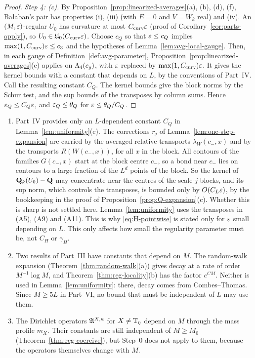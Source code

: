 \begin{proof}
\emph{Step 4: (c).} By Proposition~\ref{prop:linearized-averages}(a), (b), (d), (f), Ba\l aban's pair has properties (i), (iii) (with $E=0$ and $V=W_k$ real) and (iv). An $(M,\varepsilon)$-regular $U_0$ has curvature at most $C_{\rm curv}\varepsilon$ (proof of Corollary~\ref{cor:parts-apply}), so $U_0\in\mathfrak U_0(C_{\rm curv}\varepsilon)$. Choose $c_Q$ so that $\varepsilon\le c_Q$ implies $\max(1,C_{\rm curv})\varepsilon\le c_3$ and the hypotheses of Lemma~\ref{lem:avg-local-gauge}. Then, in each gauge of Definition~\ref{def:avg-parameter}, Proposition~\ref{prop:linearized-averages}(e) applies on $\Lambda_4(c_y)$, with $\varepsilon$ replaced by $\max(1,C_{\rm curv})\varepsilon$. It gives the kernel bounds with a constant that depends on $L$, by the conventions of Part~IV. Call the resulting constant $C_Q$. The kernel bounds give the block norms by the Schur test, and the sup bounds of the transposes by column sums. Hence $\varepsilon_Q\le C_Q\varepsilon$, and $\varepsilon_Q\le\theta_Q$ for $\varepsilon\le\theta_Q/C_Q$.
\end{proof}

\begin{remark}\label{rem:uniformity-limits}
\begin{enumerate}[label=(\alph*)]
\item Part~IV provides only an $L$-dependent constant $C_Q$ in Lemma~\ref{lem:uniformity}(c). The corrections $r_j$ of Lemma~\ref{lem:one-step-expansion} are carried by the averaged relative transports $\lambda_W(c_-,x)$ and by the transports $R(W(c_-,x))$, for all $x$ in the block. All contours of the families $G(c_-,x)$ start at the block centre $c_-$, so a bond near $c_-$ lies on contours to a large fraction of the $L^d$ points of the block. So the kernel of $\mathbf Q_k(U_0)-\mathbf Q$ may concentrate near the centres of the scale-$j$ blocks, and its sup norm, which controls the transposes, is bounded only by $O(C_L\varepsilon)$, by the bookkeeping in the proof of Proposition~\ref{prop:Q-expansion}(c). Whether this is sharp is not settled here. Lemma~\ref{lem:uniformity} uses the transposes in (A5), (A9) and (A11). This is why \eqref{eq:H-pointwise} is stated only for $\varepsilon$ small depending on $L$. This only affects how small the regularity parameter must be, not $C_H$ or $\gamma_H$.
\item Two results of Part~III have constants that depend on $M$. The random-walk expansion (Theorem~\ref{thm:random-walk}(a)) gives decay at a rate of order $M^{-1}\log M$, and Theorem~\ref{thm:reg-locality}(b) has the factor $e^{CM}$. Neither is used in Lemma~\ref{lem:uniformity}: there, decay comes from Combes--Thomas. Since $M\ge5L$ in Part~VI, no bound that must be independent of $L$ may use them.
\item The Dirichlet operators $\mathfrak A^{X,\kappa}$ for $X\ne\mathbb T_\eta$ depend on $M$ through the mass profile $m_X$. Their constants are still independent of $M\ge M_0$ (Theorem~\ref{thm:reg-coercive}), but Step~0 does not apply to them, because the operators themselves change with $M$.
\end{enumerate}
\end{remark}

